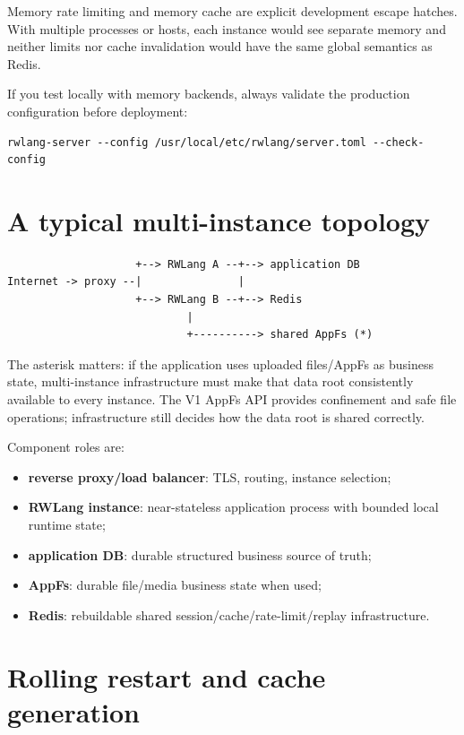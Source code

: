 Memory rate limiting and memory cache are explicit development escape hatches. With multiple processes or hosts, each instance would see separate memory and neither limits nor cache invalidation would have the same global semantics as Redis.

If you test locally with memory backends, always validate the production configuration before deployment:

\begin{lstlisting}
rwlang-server --config /usr/local/etc/rwlang/server.toml --check-config
\end{lstlisting}

\section{A typical multi-instance topology}

\begin{lstlisting}
                    +--> RWLang A --+--> application DB
Internet -> proxy --|               |
                    +--> RWLang B --+--> Redis
                            |
                            +----------> shared AppFs (*)
\end{lstlisting}

The asterisk matters: if the application uses uploaded files/AppFs as business state, multi-instance infrastructure must make that data root consistently available to every instance. The V1 AppFs API provides confinement and safe file operations; infrastructure still decides how the data root is shared correctly.

Component roles are:

\begin{itemize}
  \item \textbf{reverse proxy/load balancer}: TLS, routing, instance selection;
  \item \textbf{RWLang instance}: near-stateless application process with bounded local runtime state;
  \item \textbf{application DB}: durable structured business source of truth;
  \item \textbf{AppFs}: durable file/media business state when used;
  \item \textbf{Redis}: rebuildable shared session/cache/rate-limit/replay infrastructure.
\end{itemize}

\section{Rolling restart and cache generation}

